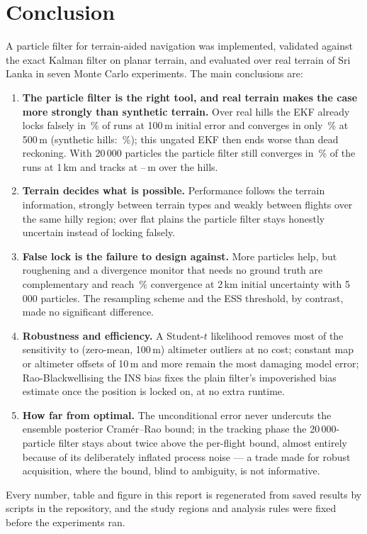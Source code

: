 \section{Conclusion}\label{sec:conclusion}

A particle filter for terrain-aided navigation was implemented, validated against the exact
Kalman filter on planar terrain, and evaluated over real terrain of Sri Lanka in seven Monte Carlo
experiments. The main conclusions are:

\begin{enumerate}
  \item \textbf{The particle filter is the right tool, and real terrain makes the case more
        strongly than synthetic terrain.} Over real hills the EKF already locks falsely in
        \EOneHillSOneZeroZeroEkfFl\,\% of runs at 100\,m initial error and converges in only
        \EOneHillSFiveZeroZeroEkfConv\,\% at 500\,m (synthetic hills:
        \EOneSynthSFiveZeroZeroEkfConv\,\%); this ungated EKF then ends worse than dead reckoning.
        With 20\,000 particles the particle filter still converges in
        \EOneHillSOneZeroZeroZeroPfTwoZeroZeroZeroZeroConv\,\% of the runs at 1\,km and tracks at
        \EOneHillSFiveZeroZeroPfTwoZeroZeroZeroZeroTrack--\EOneKandySFiveZeroZeroPfTwoZeroZeroZeroZeroTrack\,m
        over the hills.
  \item \textbf{Terrain decides what is possible.} Performance follows the terrain information,
        strongly between terrain types and weakly between flights over the same hilly region; over
        flat plains the particle filter stays honestly uncertain instead of locking falsely.
  \item \textbf{False lock is the failure to design against.} More particles help, but roughening
        and a divergence monitor that needs no ground truth are complementary and reach
        \ESixHillSTwoZeroZeroZeroPfMonitorRoughConv\,\% convergence at 2\,km initial uncertainty
        with 5\,000 particles. The resampling scheme and the ESS threshold, by contrast, made no
        significant difference.
  \item \textbf{Robustness and efficiency.} A Student-$t$ likelihood removes most of the
        sensitivity to (zero-mean, 100\,m) altimeter outliers at no cost; constant map or altimeter
        offsets of 10\,m and more remain the most damaging model error; Rao-Blackwellising the INS
        bias fixes the plain filter's impoverished bias estimate once the position is locked on,
        at no extra runtime.
  \item \textbf{How far from optimal.} The unconditional error never undercuts the ensemble
        posterior Cramér--Rao bound; in the tracking phase the 20\,000-particle filter stays about
        twice above the per-flight bound, almost entirely because of its deliberately inflated
        process noise --- a trade made for robust acquisition, where the bound, blind to ambiguity,
        is not informative.
\end{enumerate}

Every number, table and figure in this report is regenerated from saved results by scripts in the
repository, and the study regions and analysis rules were fixed before the experiments ran.
